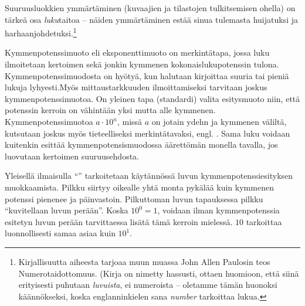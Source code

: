 Suuruusluokkien ymmärtäminen (kuvaajien ja tilastojen tulkitsemisen ohella) on tärkeä osa \textit{luku}taitoa -- näiden ymmärtäminen estää sinua tulemasta huijatuksi ja harhaanjohdetuksi.\footnote{Kirjallisuutta aiheesta tarjoaa muun muassa John Allen Paulosin teos Numerotaidottomuus. (Kirja on nimetty hassusti, ottaen huomioon, että siinä erityisesti puhutaan \textit{luvuista}, ei numeroista -- oletamme tämän huonoksi käännökseksi, koska englanninkielen sana \textit{number} tarkoittaa lukua.}

Kymmenpotenssimuoto eli eksponenttimuoto on merkintätapa, jossa luku ilmoitetaan kertoimen sekä jonkin kymmenen kokonaislukupotenssin tulona. Kymmenpotenssimuodosta on hyötyä, kun halutaan kirjoittaa suuria tai pieniä lukuja lyhyesti.Myös mittaustarkkuuden ilmoittamiseksi tarvitaan joskus kymmenpotenssimuotoa. On yleinen tapa (standardi) valita esitysmuoto niin, että potenssin kerroin on vähintään yksi mutta alle kymmenen. Kymmenpotenssimuotoa $a\cdot 10^n$, missä $a$ on jotain ydehn ja kymmenen väliltä, kutsutaan joskus myös tieteelliseksi merkintätavaksi, engl. . Sama luku voidaan kuitenkin esittää kymmenpotensismuodossa äärettömän monella tavalla, jos luovutaan kertoimen suuruusehdosta.

Yleisellä ilmaisulla ``'' tarkoitetaan käytännössä luvun kymmenpotenssiesityksen muokkaamista. Pilkku siirtyy oikealle yhtä monta pykälää kuin kymmenen potenssi pienenee ja päinvastoin. Pilkuttoman luvun tapauksessa pilkku ``kuvitellaan luvun perään''. Koska $10^0 = 1$, voidaan ilman kymmenpotenssia esitetyn luvun perään tarvittaessa lisätä tämä kerroin mielessä. $10$ tarkoittaa luonnollisesti samaa asiaa kuin $10^1$. 


